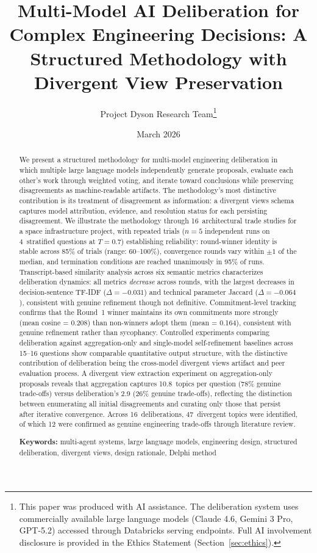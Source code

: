 \documentclass[11pt,a4paper]{article}
\title{\textbf{Multi-Model AI Deliberation for Complex Engineering Decisions: A Structured Methodology with Divergent View Preservation}}
\author{Project Dyson Research Team\thanks{This paper was produced with AI assistance. The deliberation system uses commercially available large language models (Claude 4.6, Gemini 3 Pro, GPT-5.2) accessed through Databricks serving endpoints. Full AI involvement disclosure is provided in the Ethics Statement (Section~\ref{sec:ethics}).}}
\affil{Project Dyson --- Open-Source Space Infrastructure Initiative\\ \texttt{https://projectdyson.org}}
\date{March 2026}
\begin{document}
\maketitle

\begin{abstract}
We present a structured methodology for multi-model engineering deliberation in which multiple large language models independently generate proposals, evaluate each other's work through weighted voting, and iterate toward conclusions while preserving disagreements as machine-readable artifacts. The methodology's most distinctive contribution is its treatment of disagreement as information: a divergent views schema captures model attribution, evidence, and resolution status for each persisting disagreement. We illustrate the methodology through 16~architectural trade studies for a space infrastructure project, with repeated trials ($n = 5$ independent runs on 4~stratified questions at $T = 0.7$) establishing reliability: round-winner identity is stable across 85\% of trials (range: 60--100\%), convergence rounds vary within $\pm 1$ of the median, and termination conditions are reached unanimously in 95\% of runs. Transcript-based similarity analysis across six semantic metrics characterizes deliberation dynamics: all metrics \emph{decrease} across rounds, with the largest decreases in decision-sentence TF-IDF ($\Delta = -0.031$) and technical parameter Jaccard ($\Delta = -0.064$), consistent with genuine refinement though not definitive. Commitment-level tracking confirms that the Round~1 winner maintains its own commitments more strongly (mean cosine = 0.208) than non-winners adopt them (mean = 0.164), consistent with genuine refinement rather than sycophancy. Controlled experiments comparing deliberation against aggregation-only and single-model self-refinement baselines across 15--16 questions show comparable quantitative output structure, with the distinctive contribution of deliberation being the cross-model divergent views artifact and peer evaluation process. A divergent view extraction experiment on aggregation-only proposals reveals that aggregation captures 10.8~topics per question (78\% genuine trade-offs) versus deliberation's 2.9 (26\% genuine trade-offs), reflecting the distinction between enumerating all initial disagreements and curating only those that persist after iterative convergence. Across 16~deliberations, 47~divergent topics were identified, of which 12 were confirmed as genuine engineering trade-offs through literature review.

\medskip
\noindent\textbf{Keywords:} multi-agent systems, large language models, engineering design, structured deliberation, divergent views, design rationale, Delphi method
\end{abstract}
\end{document}
